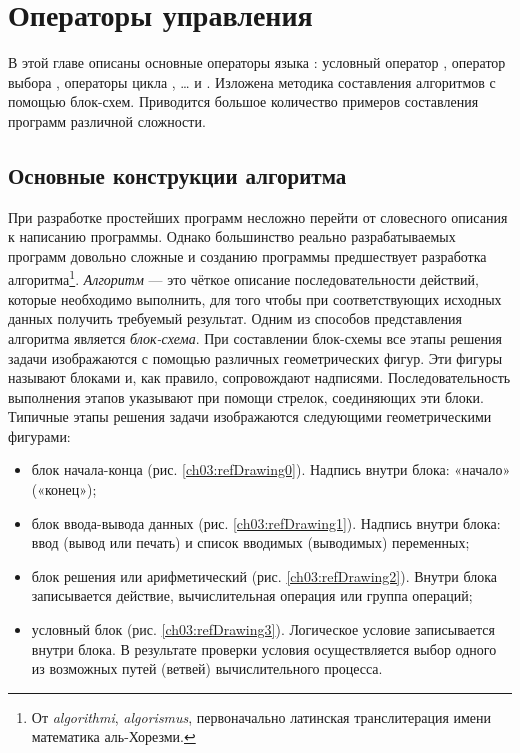 \chapter[Операторы управления]{Операторы управления}

В этой главе описаны основные операторы языка : условный оператор , оператор выбора
, операторы цикла , … и
. Изложена методика составления алгоритмов с помощью блок-схем. Приводится большое количество
примеров составления программ различной сложности. 

\section[Основные конструкции алгоритма]{Основные конструкции алгоритма}
При разработке простейших программ несложно перейти от словесного описания к написанию программы. Однако большинство
реально разрабатываемых программ довольно сложные и созданию программы предшествует разработка алгоритма\footnote{От
\emph{algorithmi}, \emph{algorismus}, первоначально латинская транслитерация имени математика
аль-Хорезми.}. \emph{Алгоритм} --- это чёткое описание последовательности действий, которые
необходимо выполнить, для того чтобы при соответствующих исходных данных получить требуемый результат. Одним из
способов представления алгоритма является \emph{блок-схема}. При составлении блок-схемы
все этапы решения задачи изображаются с помощью различных геометрических фигур. Эти фигуры называют блоками и, как
правило, сопровождают надписями. Последовательность выполнения этапов указывают при помощи стрелок, соединяющих эти
блоки. Типичные этапы решения задачи изображаются следующими геометрическими фигурами:
\begin{itemize}
\item блок начала-конца (рис. \ref{ch03:refDrawing0}). Надпись внутри блока: «начало» («конец»);

\item блок ввода-вывода данных (рис. \ref{ch03:refDrawing1}). Надпись внутри блока: ввод (вывод или печать) и список вводимых
(выводимых) переменных;

\item блок решения или арифметический (рис. \ref{ch03:refDrawing2}). 
Внутри блока записывается действие, вычислительная операция
или группа операций;

\item условный блок (рис. \ref{ch03:refDrawing3}). Логическое условие записывается внутри блока. В результате проверки условия
осуществляется выбор одного из возможных путей (ветвей) вычислительного процесса. 
\end{itemize}
